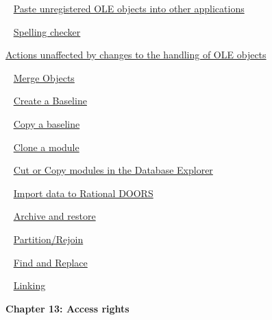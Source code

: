 \documentclass[11pt,a4paper]{article}
\begin{document}
\,\,\, \href{https://www.ibm.com/support/knowledgecenter/search/Paste%20unregistered%20OLE%20objects%20into%20other%20applications?scope=SSYQBZ_9.6.1}{Paste unregistered OLE objects into other applications}

\,\,\, \href{https://www.ibm.com/support/knowledgecenter/search/Spelling%20checker?scope=SSYQBZ_9.6.1}{Spelling checker}

\href{https://www.ibm.com/support/knowledgecenter/search/Actions%20unaffected%20by%20changes%20to%20the%20handling%20of%20OLE%20objects?scope=SSYQBZ_9.6.1}{Actions unaffected by changes to the handling of OLE objects}

\,\,\, \href{https://www.ibm.com/support/knowledgecenter/search/Merge%20Objects?scope=SSYQBZ_9.6.1}{Merge Objects}

\,\,\, \href{https://www.ibm.com/support/knowledgecenter/search/Create%20a%20Baseline?scope=SSYQBZ_9.6.1}{Create a Baseline}

\,\,\, \href{https://www.ibm.com/support/knowledgecenter/search/Copy%20a%20baseline?scope=SSYQBZ_9.6.1}{Copy a baseline}

\,\,\, \href{https://www.ibm.com/support/knowledgecenter/search/Clone%20a%20module?scope=SSYQBZ_9.6.1}{Clone a module}

\,\,\, \href{https://www.ibm.com/support/knowledgecenter/search/Cut%20or%20Copy%20modules%20in%20the%20Database%20Explorer?scope=SSYQBZ_9.6.1}{Cut or Copy modules in the Database Explorer}

\,\,\, \href{https://www.ibm.com/support/knowledgecenter/search/Import%20data%20to%20Rational%20DOORS?scope=SSYQBZ_9.6.1}{Import data to Rational DOORS}

\,\,\, \href{https://www.ibm.com/support/knowledgecenter/search/Archive%20and%20restore?scope=SSYQBZ_9.6.1}{Archive and restore}

\,\,\, \href{https://www.ibm.com/support/knowledgecenter/search/Partition/Rejoin?scope=SSYQBZ_9.6.1}{Partition/Rejoin}

\,\,\, \href{https://www.ibm.com/support/knowledgecenter/search/Find%20and%20Replace?scope=SSYQBZ_9.6.1}{Find and Replace}

\,\,\, \href{https://www.ibm.com/support/knowledgecenter/search/Linking?scope=SSYQBZ_9.6.1}{Linking} \\



\begin{Large}\textbf{Chapter 13: Access rights} \end{Large} 
\vspace{1mm}
\end{document}
